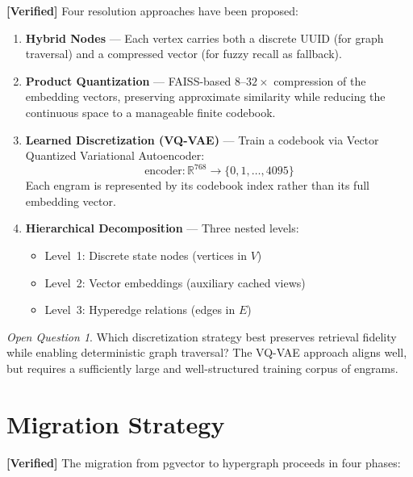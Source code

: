 \documentclass[11pt]{article}
\newcommand{\verified}{\textcolor{verifiedgreen}{\textbf{[Verified]}}}
\theoremstyle{definition}
\theoremstyle{remark}
\newtheorem{openquestion}{Open Question}[section]
\begin{document}
\noindent
\verified{} Four resolution approaches have been proposed:

\begin{enumerate}[label=\textbf{\arabic*.}, leftmargin=2em]
  \item \textbf{Hybrid Nodes} --- Each vertex carries both a discrete UUID
    (for graph traversal) and a compressed vector (for fuzzy recall as
    fallback).

  \item \textbf{Product Quantization} --- FAISS-based $8$--$32\times$
    compression of the embedding vectors, preserving approximate similarity
    while reducing the continuous space to a manageable finite codebook.

  \item \textbf{Learned Discretization (VQ-VAE)} --- Train a codebook via
    Vector Quantized Variational Autoencoder:
    \[
      \text{encoder} : \mathbb{R}^{768} \longrightarrow \{0, 1, \ldots, 4095\}
    \]
    Each engram is represented by its codebook index rather than its full
    embedding vector.

  \item \textbf{Hierarchical Decomposition} --- Three nested levels:
    \begin{itemize}[nosep]
      \item Level~1: Discrete state nodes (vertices in $V$)
      \item Level~2: Vector embeddings (auxiliary cached views)
      \item Level~3: Hyperedge relations (edges in $E$)
    \end{itemize}
\end{enumerate}

\begin{openquestion}
Which discretization strategy best preserves retrieval fidelity while enabling
deterministic graph traversal? The VQ-VAE approach aligns well, but requires a
sufficiently large and well-structured training corpus of engrams.
\end{openquestion}

\section{Migration Strategy}
\label{sec:migration}

\verified{} The migration from pgvector to hypergraph proceeds in four phases:
\end{document}
